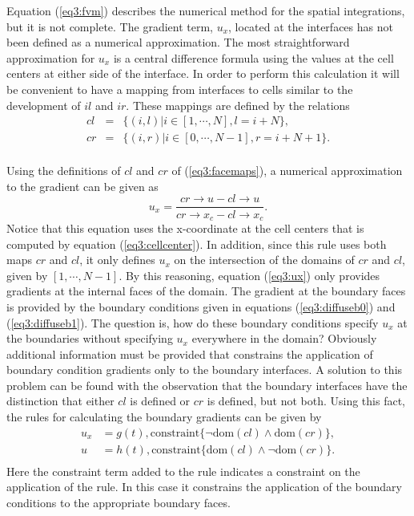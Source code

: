 \documentclass[10pt,epsf,letterpaper,twoside]{book}
\begin{document}
Equation (\ref{eq3:fvm}) describes the numerical method for
the spatial integrations, but it is not complete.  The gradient term,
$u_x$, located at the interfaces has not been defined as a numerical
approximation.  The most straightforward approximation for $u_x$ is a
central difference formula using the values at the cell centers at
either side of the interface.  In order to perform this calculation it
will be convenient to have a mapping from interfaces to cells similar to
the development of $il$ and $ir$.  These mappings are defined by
the relations
\begin{equation}
\begin{array}{rcl}
cl & = & \lbrace (i,l) | i \in [1, \cdots, N], l = i+N \rbrace,\\
cr & = & \lbrace (i,r) | i \in [0, \cdots, N-1], r = i+N+1 \rbrace.\\
\end{array}
\label{eq3:facemaps}
\end{equation}

Using the definitions of $cl$ and $cr$ of (\ref{eq3:facemaps}), a
numerical approximation to the gradient can be given as
\begin{equation}
  u_x = \frac{cr\rightarrow u - cl\rightarrow u}
{cr\rightarrow x_c - cl\rightarrow x_c}.
\label{eq3:ux}
\end{equation}
Notice that this equation uses the x-coordinate at the cell centers
that is computed by equation (\ref{eq3:cellcenter}).  In addition,
since this rule uses both maps $cr$ and $cl$, it only defines $u_x$ on
the intersection of the domains of $cr$ and $cl$, given by $[1, \cdots,
N-1]$.  By this reasoning, equation (\ref{eq3:ux}) only provides
gradients at the internal faces of the domain.  The gradient at the
boundary faces is provided by the boundary conditions given in
equations (\ref{eq3:diffuseb0}) and (\ref{eq3:diffuseb1}).  The
question is, how do these boundary conditions specify $u_x$ at the
boundaries without specifying $u_x$ everywhere in the domain?
Obviously additional information must be provided that constrains
the application of boundary condition gradients only to the boundary
interfaces.  A solution to this problem can be found with the
observation that the boundary interfaces have the distinction that
either $cl$ is defined or $cr$ is defined, but not both.  Using this
fact, the rules for calculating the boundary gradients can be given by
\begin{equation}
\begin{aligned}
u_x & = g(t), \mbox{constraint}\lbrace \neg \mathrm{dom}(cl) \wedge
\mathrm{dom}(cr) \rbrace, \label{eq3:brule0}\\
u & = h(t), \mbox{constraint}\lbrace \mathrm{dom}(cl)
\wedge \neg \mathrm{dom}(cr) \rbrace.\\ %
\end{aligned}
\end{equation}
Here the constraint term added to the rule indicates a constraint on
the application of the rule.  In this case it constrains the
application of the boundary conditions to the appropriate boundary faces.
\end{document}
